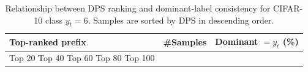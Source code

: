 \begin{table}[t]
\centering
\begin{tabular}{lrr}
\toprule
Top-ranked prefix & \#Samples & Dominant $= y_t$ (\%) \\
\midrule
Top 20%
Top 40%
Top 60%
Top 80%
Top 100%
\bottomrule
\caption{Relationship between DPS ranking and dominant-label consistency for CIFAR-10 class $y_t=6$. Samples are sorted by DPS in descending order.}
\label{tab:class_6_prefix}
\end{tabular}
\end{table}
